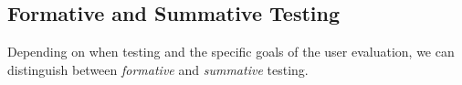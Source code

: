 




\subsection{Formative and Summative Testing}
Depending on  when  testing  and the specific goals of the user evaluation, we can distinguish between \textit{formative}  and \textit{summative} testing.

